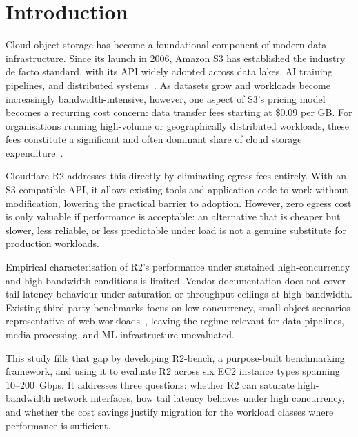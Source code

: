 
\chapter{Introduction}\label{chapter:introduction}

Cloud object storage has become a foundational component of modern data infrastructure. Since its launch in 2006, Amazon S3 has established the industry de facto standard, with its API widely adopted across data lakes, AI training pipelines, and distributed systems~\cite{aws-s3-overview}. As datasets grow and workloads become increasingly bandwidth-intensive, however, one aspect of S3’s pricing model becomes a recurring cost concern: data transfer fees starting at \$0.09 per GB. For organisations running high-volume or geographically distributed workloads, these fees constitute a significant and often dominant share of cloud storage expenditure~\cite{cerre2024cloud,wasabi2024index}.

Cloudflare R2 addresses this directly by eliminating egress fees entirely. With an S3-compatible API, it allows existing tools and application code to work without modification, lowering the practical barrier to adoption. However, zero egress cost is only valuable if performance is acceptable: an alternative that is cheaper but slower, less reliable, or less predictable under load is not a genuine substitute for production workloads.

Empirical characterisation of R2’s performance under sustained high-concurrency and high-bandwidth conditions is limited. Vendor documentation does not cover tail-latency behaviour under saturation or throughput ceilings at high bandwidth. Existing third-party benchmarks focus on low-concurrency, small-object scenarios representative of web workloads~\cite{kerkour2024s3r2,tigris-benchmark}, leaving the regime relevant for data pipelines, media processing, and ML infrastructure unevaluated.

This study fills that gap by developing R2-bench, a purpose-built benchmarking framework, and using it to evaluate R2 across six EC2 instance types spanning 10--200~Gbps. It addresses three questions: whether R2 can saturate high-bandwidth network interfaces, how tail latency behaves under high concurrency, and whether the cost savings justify migration for the workload classes where performance is sufficient.
